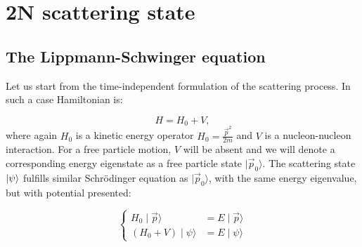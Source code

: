 \section{2N scattering state}

\subsection{The Lippmann-Schwinger equation}




    Let us start from the time-independent formulation of the scattering process.
    In such a case Hamiltonian is:

    \begin{equation}
        H = H_0 + V,
    \end{equation}
    where again $H_0$ is a kinetic energy operator $H_0 = \frac{\vec{p}^2}{2m}$ 
    and $V$ is a nucleon-nucleon interaction.
    For a free particle motion, $V$ will be absent and we will denote a corresponding energy eigenstate as
    a free particle state $\mid \vec{p}_0 \rangle$.
    The scattering state $\ket{\psi}$ fulfills similar Schr\"{o}dinger equation as 
    $\mid \vec{p}_0 \rangle$, with the same energy eigenvalue, but with potential presented:
    


    \begin{equation}
        \begin{cases}
            H_0 \mid \vec{p} \rangle &= E \mid \vec{p} \rangle \\
            (H_0 + V) \mid \psi \rangle &= E \mid \psi \rangle
        \end{cases}
        \label{system}
    \end{equation}

